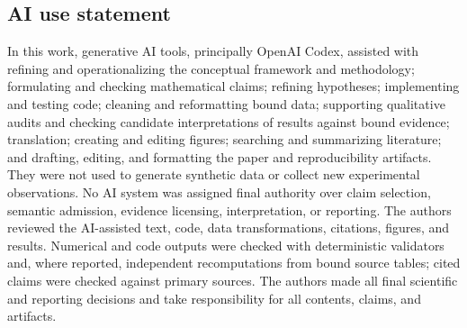 \documentclass{article}
\begin{document}
\clearpage
\subsection*{AI use statement}

In this work, generative AI tools, principally OpenAI Codex, assisted with refining and operationalizing the conceptual framework and methodology; formulating and checking mathematical claims; refining hypotheses; implementing and testing code; cleaning and reformatting bound data; supporting qualitative audits and checking candidate interpretations of results against bound evidence; translation; creating and editing figures; searching and summarizing literature; and drafting, editing, and formatting the paper and reproducibility artifacts.  They were not used to generate synthetic data or collect new experimental observations.  No AI system was assigned final authority over claim selection, semantic admission, evidence licensing, interpretation, or reporting.  The authors reviewed the AI-assisted text, code, data transformations, citations, figures, and results.  Numerical and code outputs were checked with deterministic validators and, where reported, independent recomputations from bound source tables; cited claims were checked against primary sources.  The authors made all final scientific and reporting decisions and take responsibility for all contents, claims, and artifacts.

\clearpage


\fontsize{9.0}{10.20}\selectfont

\end{document}
